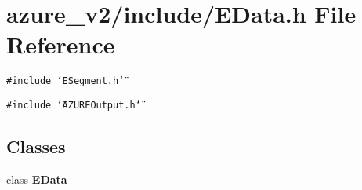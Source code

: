 \section{azure\_\-v2/include/EData.h File Reference}
\label{EData_8h}
{\tt \#include \char`\"{}ESegment.h\char`\"{}}\par
{\tt \#include \char`\"{}AZUREOutput.h\char`\"{}}\par
\subsection*{Classes}
\begin{CompactItemize}
\item 
class \bf{EData}
\end{CompactItemize}
